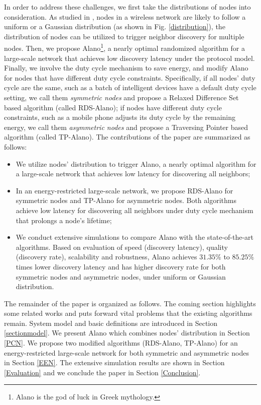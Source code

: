 In order to address these challenges, we first take the distributions of nodes into consideration. As studied in \cite{wang2013gaussian}, nodes in a wireless network are likely to follow a uniform or a Gaussian distribution (as shown in Fig. \ref{distribution}), the distribution of nodes can be utilized to trigger neighbor discovery for multiple nodes. Then, we propose Alano\footnote{Alano is the god of luck in Greek mythology.}, a nearly optimal randomized algorithm for a large-scale network that achieves low discovery latency under the protocol model. Finally, we involve the duty cycle mechanism to save energy, and modify Alano for nodes that have different duty cycle constraints. Specifically, if all nodes' duty cycle are the same, such as a batch of intelligent devices have a default duty cycle setting, we call them \emph{symmetric nodes} and propose a Relaxed Difference Set based algorithm (called RDS-Alano); if nodes have different duty cycle constraints, such as a mobile phone adjusts its duty cycle by the remaining energy, we call them \emph{asymmetric nodes} and propose a Traversing Pointer based algorithm (called TP-Alano).
The contributions of the paper are summarized as follows:
\begin{itemize}
\item[1)] We utilize nodes' distribution to trigger Alano, a nearly optimal algorithm for a large-scale network that achieves low latency for discovering all neighbors;
\item[2)] In an energy-restricted large-scale network, we propose RDS-Alano for symmetric nodes and TP-Alano for asymmetric nodes. Both algorithms achieve low latency for discovering all neighbors under duty cycle mechanism that prolongs a node's lifetime;
\item[3)] We conduct extensive simulations to compare Alano with the state-of-the-art algorithms. Based on evaluation of speed (discovery latency), quality (discovery rate), scalability and robustness, Alano achieves $31.35\%$ to $ 85.25\%$ times lower discovery latency and has higher discovery rate for both symmetric nodes and asymmetric nodes, under uniform or Gaussian distribution.
\end{itemize}

The remainder of the paper is organized as follows. The coming section highlights some related works and puts forward vital problems that the existing algorithms remain. System model and basic definitions are introduced in Section \ref{sectionmodel}. We present Alano which combines nodes' distribution in Section \ref{PCN}. We propose two modified algorithms (RDS-Alano, TP-Alano) for an energy-restricted large-scale network for both symmetric and asymmetric nodes in Section \ref{EEN}. The extensive simulation results are shown in Section \ref{Evaluation} and we conclude the paper in Section \ref{Conclusion}.




